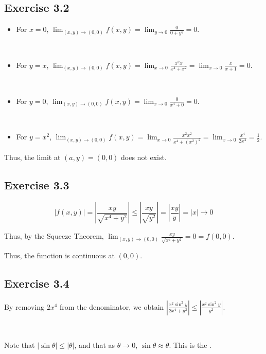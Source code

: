 \documentclass[11pt,fleqn]{book} %
\begin{document}
\subsection*{Exercise 3.2}

\begin{itemize}
        \item For $x = 0$, $\lim_{(x,y)\to(0,0)}f(x,y) = \lim_{y\to0}\frac{0}{0 + y^2} = 0$. 

        {~~~}

        \item For $y = x$, $\lim_{(x,y)\to(0,0)}f(x,y) = \lim_{x\to0} \frac{x^2x}{x^4 + x^2} = \lim_{x\to0} \frac{x}{x+1} = 0$. 

        {~~~}

        \item For $y = 0$, $\lim_{(x,y)\to(0,0)}f(x,y) = \lim_{x\to0}\frac{0}{x^4 + 0} = 0$. 

        {~~~}

        \item For $y = x^2$, $\lim_{(x,y)\to(0,0)}f(x,y) = \lim_{x\to0} \frac{x^2x^2}{x^4 + (x^2)^2} = \lim_{x\to0} \frac{x^4}{2x^4} = \frac{1}{2}$. 
\end{itemize} 

Thus, the limit at $(a,y) = (0,0)$ does not exist. 

\subsection*{Exercise 3.3}

$$|f(x, y)| = \left| \frac{xy}{\sqrt{x^4 + y^2}} \right| \le \left| \frac{xy}{\sqrt{y^2}} \right| = \left| \frac{xy}{y} \right| = |x| \to 0$$

Thus, by the Squeeze Theorem, $\lim_{(x,y) \to (0,0)} \frac{xy}{\sqrt{x^4 + y^2}} = 0 = f(0, 0)$. 

Thus, the function is continuous at $(0, 0)$. 

\subsection*{Exercise 3.4}

By removing $2x^4$ from the denominator, we obtain $\left| \frac{x^2 \sin^2{y}}{2x^4 + y^2} \right| \le \left| \frac{x^2 \sin^2{y}}{y^2} \right|$. 

{~~~}

Note that $| \sin{\theta} | \le | \theta |$, and that as $\theta \to 0$, $\sin \theta \approx \theta$. This is the . 
\end{document}
